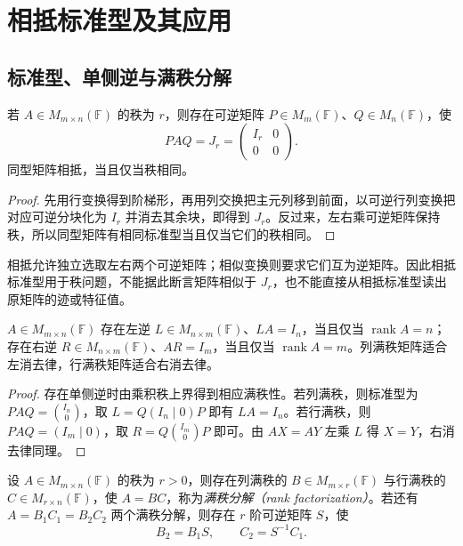 \section{相抵标准型及其应用}
\label{sec:laex-equivalence-form}

\subsection{标准型、单侧逆与满秩分解}

\begin{theorem}
\label{thm:laex-equivalence-form}
若 $A\in M_{m\times n}(\mathbb F)$ 的秩为 $r$，则存在可逆矩阵 $P\in M_m(\mathbb F)$、$Q\in M_n(\mathbb F)$，使
\begin{equation}
\label{eq:laex-equivalence-form}
PAQ=J_r=\begin{pmatrix}I_r&0\\0&0\end{pmatrix}.
\end{equation}
同型矩阵相抵，当且仅当秩相同。
\end{theorem}

\begin{proof}
先用行变换得到阶梯形，再用列交换把主元列移到前面，以可逆行列变换把对应可逆分块化为 $I_r$ 并消去其余块，即得到 $J_r$。反过来，左右乘可逆矩阵保持秩，所以同型矩阵有相同标准型当且仅当它们的秩相同。
\end{proof}

相抵允许独立选取左右两个可逆矩阵；相似变换则要求它们互为逆矩阵。因此相抵标准型用于秩问题，不能据此断言矩阵相似于 $J_r$，也不能直接从相抵标准型读出原矩阵的迹或特征值。

\begin{proposition}
\label{prop:laex-one-sided-inverse}
$A\in M_{m\times n}(\mathbb F)$ 存在左逆 $L\in M_{n\times m}(\mathbb F)$、$LA=I_n$，当且仅当 $\operatorname{rank}A=n$；存在右逆 $R\in M_{n\times m}(\mathbb F)$、$AR=I_m$，当且仅当 $\operatorname{rank}A=m$。列满秩矩阵适合左消去律，行满秩矩阵适合右消去律。
\end{proposition}

\begin{proof}
存在单侧逆时由乘积秩上界得到相应满秩性。若列满秩，则标准型为 $PAQ=\binom{I_n}{0}$，取 $L=Q(I_n\mid0)P$ 即有 $LA=I_n$。若行满秩，则 $PAQ=(I_m\mid0)$，取 $R=Q\binom{I_m}{0}P$ 即可。由 $AX=AY$ 左乘 $L$ 得 $X=Y$，右消去律同理。
\end{proof}

\begin{theorem}
\label{thm:laex-rank-factorization}
设 $A\in M_{m\times n}(\mathbb F)$ 的秩为 $r>0$，则存在列满秩的 $B\in M_{m\times r}(\mathbb F)$ 与行满秩的 $C\in M_{r\times n}(\mathbb F)$，使 $A=BC$，称为\emph{满秩分解（rank factorization）}。若还有 $A=B_1C_1=B_2C_2$ 两个满秩分解，则存在 $r$ 阶可逆矩阵 $S$，使
\[
B_2=B_1S,\qquad C_2=S^{-1}C_1.
\]
\end{theorem}

